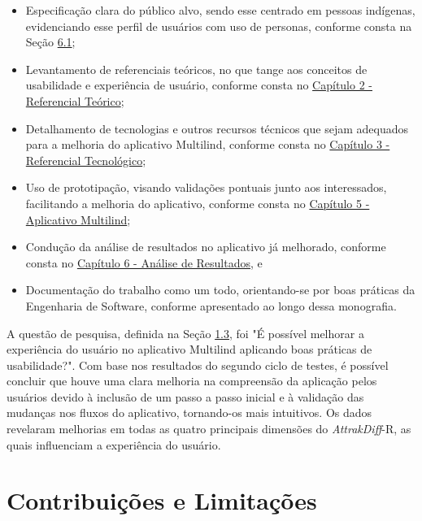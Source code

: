     \begin{itemize}
              \item Especificação clara do público alvo, sendo esse centrado em pessoas indígenas, evidenciando esse perfil de usuários com uso de personas, conforme consta na Seção \hyperref[sec:Personas]{6.1};

              \item Levantamento de referenciais teóricos, no que tange aos conceitos de usabilidade e experiência de usuário, conforme consta no \hyperref[chap:Referencial]{Capítulo 2 - Referencial Teórico};

              \item Detalhamento de tecnologias e outros recursos técnicos que sejam adequados para a melhoria do aplicativo Multilind, conforme consta no \hyperref[chap:ReferencialTech]{Capítulo 3 - Referencial Tecnológico};

              \item Uso de prototipação, visando validações pontuais junto aos interessados, facilitando a melhoria do aplicativo, conforme consta no \hyperref[chap:Aplicativo Multilind]{Capítulo 5 - Aplicativo Multilind};

              \item Condução da análise de resultados no aplicativo já melhorado, conforme consta no \hyperref[chap:Análise dos Resultados]{Capítulo 6 - Análise de Resultados}, e
              
              \item Documentação do trabalho como um todo, orientando-se por boas práticas da Engenharia de Software, conforme apresentado ao longo dessa monografia.
    \end{itemize}

A questão de pesquisa, definida na Seção \hyperref[sec:QuestaodePesquisa]{1.3}, foi "É possível melhorar a experiência do usuário no aplicativo 
Multilind aplicando boas práticas de usabilidade?". Com base nos resultados do segundo ciclo de testes, é possível concluir que houve uma clara melhoria na compreensão da aplicação 
pelos usuários devido à inclusão de um passo a passo inicial e à validação das mudanças nos fluxos do aplicativo, tornando-os mais intuitivos. Os dados revelaram melhorias em todas 
as quatro principais dimensões do \textit{AttrakDiff}-R, as quais influenciam a experiência do usuário.

\section{Contribuições e Limitações}
\label{sec:Contribuições e Limitações}

